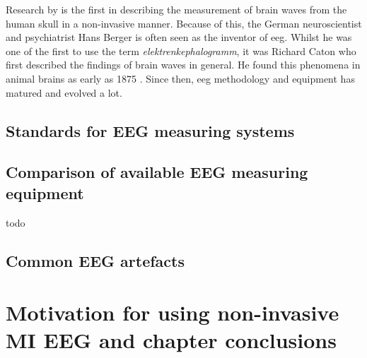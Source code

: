 \lipsum[1-7]

Research by \citet{human_eeg_discovery} is the first in describing the measurement of brain waves from the human skull in a non-invasive manner.
Because of this, the German neuroscientist and psychiatrist Hans Berger is often seen as the inventor of \gls{eeg}.
Whilst he was one of the first to use the term \textit{elektrenkephalogramm}, it was Richard Caton who first described the findings of brain waves in general.
He found this phenomena in animal brains as early as 1875 \citep{first_eeg}.
Since then, \gls{eeg} methodology and equipment has matured and evolved a lot.


\subsection{Standards for EEG measuring systems}
\label{subsec:biomedical_signals_measuring_standards}

\lipsum[1-2]


\subsection{Comparison of available EEG measuring equipment}
\label{subsec:biomedical_signals_measuring_equipment}

todo
\lipsum[1-7]




\subsection{Common EEG artefacts}
\label{subsec:biomedical_signals_measuring_artefacts}

\lipsum[1-5]

\section{Motivation for using non-invasive MI EEG and chapter conclusions}
\label{sec:biomedical_signals_eeg_motivation_and_summary}


\lipsum[1-3]